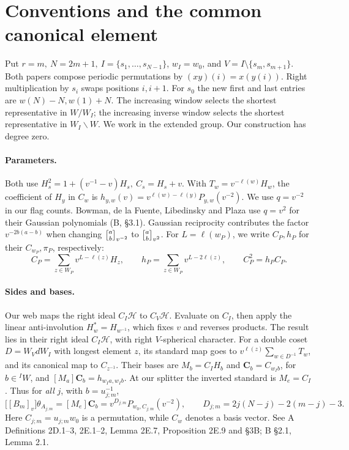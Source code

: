 \newpage\section{Conventions and the common canonical element}

Put \(r=m,\ N=2m+1,\ I=\{s_1,\ldots,s_{N-1}\}\), \(w_I=w_0\), and
\(V=I\setminus\{s_m,s_{m+1}\}\). Both papers compose periodic permutations by
\((xy)(i)=x(y(i))\). Right multiplication by \(s_i\) swaps positions \(i,i+1\).
For \(s_0\) the new first and last entries are \(w(N)-N,w(1)+N\).
The increasing window selects the shortest representative in \(W/W_I\);
the increasing inverse window selects the shortest representative in
\(W_I\backslash W\). We work in the extended group. Our construction has degree zero.

\paragraph{Parameters.}
Both use \(H_s^2=1+(v^{-1}-v)H_s,\ C_s=H_s+v\). With
\(T_w=v^{-\ell(w)}H_w\), the coefficient of \(H_y\) in \(C_w\) is
\(h_{y,w}(v)=v^{\ell(w)-\ell(y)}P_{y,w}(v^{-2})\).
We use \(q=v^{-2}\) in our flag counts. Bowman, de la Fuente, Libedinsky and Plaza use \(q=v^2\) for their Gaussian polynomials (B, \S3.1). Gaussian reciprocity contributes the factor
\(v^{-2b(a-b)}\) when changing \(\gb{a}{b}_{v^{-2}}\) to
\(\gb{a}{b}_{v^2}\). For \(L=\ell(w_P)\), we write \(C_P,h_P\) for their
\(C_{w_P},\pi_P\), respectively:
\[
 C_P=\sum_{z\in W_P}v^{L-\ell(z)}H_z,\qquad
 h_P=\sum_{z\in W_P}v^{L-2\ell(z)},\qquad C_P^2=h_PC_P .
\]

\paragraph{Sides and bases.}
Our web maps the right ideal \(C_I\mathcal H\) to \(C_V\mathcal H\).
Evaluate on \(C_I\), then apply the linear anti-involution
\(H_w^*=H_{w^{-1}}\), which fixes \(v\) and reverses products. The result
lies in their right ideal \(C_I\mathcal H\), with right \(V\)-spherical character.
For a double coset \(D=W_VdW_I\) with longest element \(z\), its standard
map goes to \(v^{\ell(z)}\sum_{w\in D^{-1}}T_w\), and its canonical map
to \(C_{z^{-1}}\). Their bases are \(M_b=C_IH_b\) and
\(\mathbf C_b=C_{w_Ib}\), for \(b\in{}^IW\), and
\([M_a]\mathbf C_b=h_{w_Ia,w_Ib}\).
At our splitter the inverted standard is \(M_e=C_I\).
Thus for \emph{all} \(j\), with \(b=u_{j;m}^{-1}\),
\[
 \big[[B_m]_v\big]\theta_{A_{j;m}}=[M_e]\mathbf C_b
   =v^{D_{j;m}}P_{w_0,C_{j;m}}(v^{-2}),\qquad
 D_{j;m}=2j(N-j)-2(m-j)-3 .
\]
Here \(C_{j;m}=u_{j;m}w_0\) is a permutation, while \(C_w\) denotes a
basis vector. See A Definitions 2D.1--3, 2E.1--2, Lemma 2E.7,
Proposition 2E.9 and \S3B; B \S2.1, Lemma 2.1.

